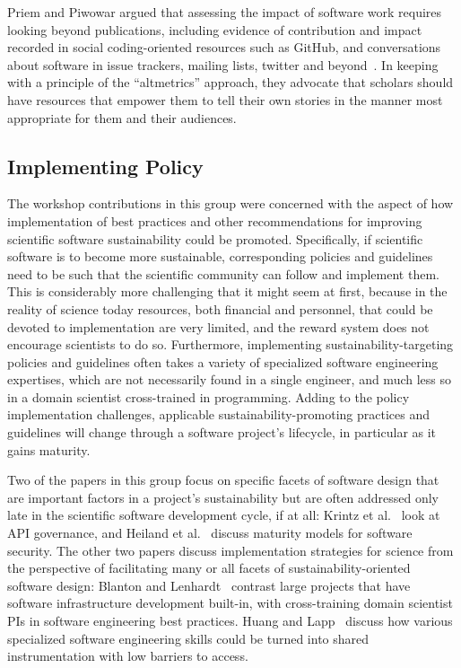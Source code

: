 \documentclass[11pt, oneside]{amsart}
\begin{document}
Priem and Piwowar argued that assessing the impact of software work requires
looking beyond publications, including evidence of contribution and impact
recorded in social coding-oriented resources such as GitHub, and conversations
about software in issue trackers, mailing lists, twitter and
beyond~\cite{Priem_WSSSPE}. In keeping with a principle of the ``altmetrics''
approach, they advocate that scholars should have resources that empower them
to tell their own stories in the manner most appropriate for them and their
audiences.

\subsection{Implementing Policy}

The workshop contributions in this group were concerned with the
aspect of how implementation of best practices and other
recommendations for improving scientific software sustainability could
be promoted. Specifically, if scientific software is to become more
sustainable, corresponding policies and guidelines need to be such
that the scientific community can follow and implement them. This is
considerably more challenging that it might seem at first, because in
the reality of science today resources, both financial and personnel,
that could be devoted to implementation are very limited, and the
reward system does not encourage scientists to do so. Furthermore,
implementing sustainability-targeting policies and guidelines often
takes a variety of specialized software engineering expertises, which
are not necessarily found in a single engineer, and much less so in a
domain scientist cross-trained in programming. Adding to the policy
implementation challenges, applicable sustainability-promoting
practices and guidelines will change through a software project's
lifecycle, in particular as it gains maturity.

Two of the papers in this group focus on specific facets of software
design that are important factors in a project's sustainability but
are often addressed only late in the scientific software development
cycle, if at all: Krintz et al.~\cite{Krintz_WSSSPE} look at API
governance, and Heiland et al.~\cite{Heiland_WSSSPE} discuss maturity
models for software security. The other two papers discuss
implementation strategies for science from the perspective of
facilitating many or all facets of sustainability-oriented software
design: Blanton and Lenhardt~\cite{Blanton_WSSSPE} contrast
large projects that have software infrastructure development built-in,
with cross-training domain scientist PIs in software engineering best
practices. Huang and Lapp~\cite{Huang_WSSSPE} discuss how various
specialized software engineering skills could be turned into shared
instrumentation with low barriers to access.
\end{document}
